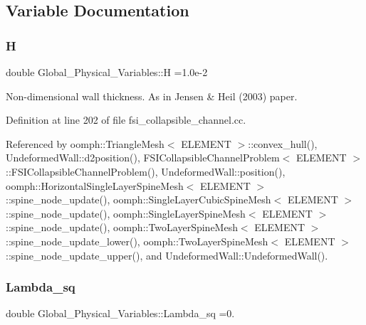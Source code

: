 \subsection{Variable Documentation}
\mbox{\label{namespaceGlobal__Physical__Variables_af6e07423e22c0991084d9a2f43727805}} 
\subsubsection{\texorpdfstring{H}{H}}
{\footnotesize\ttfamily double Global\+\_\+\+Physical\+\_\+\+Variables\+::H =1.\+0e-\/2}



Non-\/dimensional wall thickness. As in Jensen \& Heil (2003) paper. 



Definition at line 202 of file fsi\+\_\+collapsible\+\_\+channel.\+cc.



Referenced by oomph\+::\+Triangle\+Mesh$<$ E\+L\+E\+M\+E\+N\+T $>$\+::convex\+\_\+hull(), Undeformed\+Wall\+::d2position(), F\+S\+I\+Collapsible\+Channel\+Problem$<$ E\+L\+E\+M\+E\+N\+T $>$\+::\+F\+S\+I\+Collapsible\+Channel\+Problem(), Undeformed\+Wall\+::position(), oomph\+::\+Horizontal\+Single\+Layer\+Spine\+Mesh$<$ E\+L\+E\+M\+E\+N\+T $>$\+::spine\+\_\+node\+\_\+update(), oomph\+::\+Single\+Layer\+Cubic\+Spine\+Mesh$<$ E\+L\+E\+M\+E\+N\+T $>$\+::spine\+\_\+node\+\_\+update(), oomph\+::\+Single\+Layer\+Spine\+Mesh$<$ E\+L\+E\+M\+E\+N\+T $>$\+::spine\+\_\+node\+\_\+update(), oomph\+::\+Two\+Layer\+Spine\+Mesh$<$ E\+L\+E\+M\+E\+N\+T $>$\+::spine\+\_\+node\+\_\+update\+\_\+lower(), oomph\+::\+Two\+Layer\+Spine\+Mesh$<$ E\+L\+E\+M\+E\+N\+T $>$\+::spine\+\_\+node\+\_\+update\+\_\+upper(), and Undeformed\+Wall\+::\+Undeformed\+Wall().

\mbox{\label{namespaceGlobal__Physical__Variables_a6fe17557ceb32dd353827fba60408363}} 
\subsubsection{\texorpdfstring{Lambda\+\_\+sq}{Lambda\_sq}}
{\footnotesize\ttfamily double Global\+\_\+\+Physical\+\_\+\+Variables\+::\+Lambda\+\_\+sq =0.}



